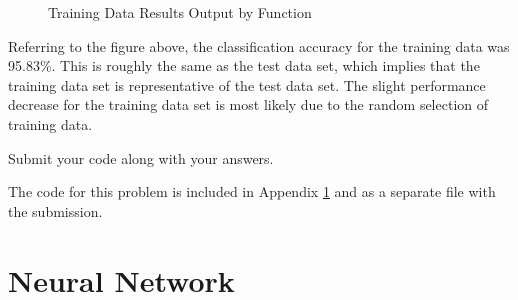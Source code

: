 \documentclass[fleqn]{article}
\begin{document}
\begin{enumerate}
\begin{enumerate}
			\begin{figure}[H]
				\centerline{}
				\caption{Training Data Results Output by Function}
				\label{training_data_results}
			\end{figure}
		
			Referring to the figure above, the classification accuracy for the training data was 95.83\%. This is roughly the same as the test data set, which implies that the training data set is representative of the test data set. The slight performance decrease for the training data set is most likely due to the random selection of training data.
			
		\end{enumerate}
		
		Submit your code along with your answers.
		
		The code for this problem is included in Appendix \ref{neural_network} and as a separate file with the submission.
		
	\end{enumerate}
	
	\pagebreak
	\appendix
	\section{Neural Network}
	\label{neural_network}
	\lstset{style=Matlab-editor,basicstyle=\ttfamily\footnotesize}
	
	\raggedbottom
	\pagebreak
\end{document}
